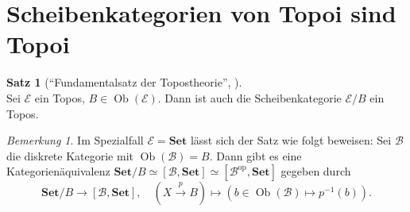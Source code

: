 \documentclass{article}
\theoremstyle{definition}
\newtheorem*{satz}{Satz}
\theoremstyle{remark}
\newtheorem*{bem}{Bemerkung}
\newcommand{\?}{\,{:}\,}
\renewcommand{\_}{\mathpunct{.}\,}
\DeclareMathOperator{\Ob}{Ob} %
\newcommand{\op}{\mathrm{op}} %
\newcommand{\SetC}{\mathbf{Set}} %
\newcommand{\FuncC}[2]{[{#1}, {#2}]} %
\newcommand{\Bat}{\mathcal{B}} %
\newcommand{\Eat}{\mathcal{E}} %
\begin{document}
\section{Scheibenkategorien von Topoi sind Topoi}

\begin{satz}["`Fundamentalsatz der Topostheorie"', {\cite[IV.7.1]{sigal}}] \mbox{}\\
  Sei $\Eat$ ein Topos, $B \in \Ob(\Eat)$.
  Dann ist auch die Scheibenkategorie $\Eat / B$ ein Topos.
\end{satz}

\begin{bem}
  Im Spezialfall $\Eat = \SetC$ lässt sich der Satz wie folgt beweisen:
  Sei $\Bat$ die diskrete Kategorie mit $\Ob(\Bat) = B$.
  Dann gibt es eine Kategorienäquivalenz $\SetC/B \simeq \FuncC{\Bat}{\SetC} \simeq \FuncC{\Bat^\op}{\SetC}$ gegeben durch
  \[
    \SetC/B \to \FuncC{\Bat}{\SetC}, \quad  
    (X \xrightarrow{p} B) \mapsto (b \in \Ob(\Bat) \mapsto p^{-1}(b)).
  \]
\end{bem}
\end{document}
